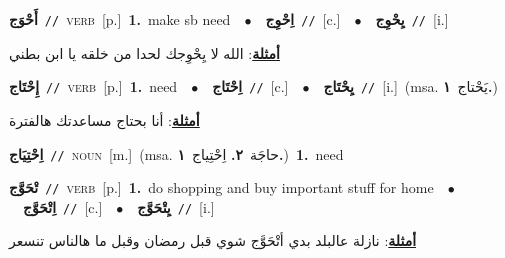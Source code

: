 \documentclass[10pt,a4paper,twoside]{article} %
\begin{document}
\begin{multicols}{2}
{\setlength\topsep{0pt}\textbf{\foreignlanguage{arabic}{أَحْوَج}}\ {\color{gray}\texttt{//}\color{black}}\ \textsc{verb}\ [p.]\ \textbf{1.}~make sb need\ \ $\bullet$\ \ \setlength\topsep{0pt}\textbf{\foreignlanguage{arabic}{اِحْوِج}}\ {\color{gray}\texttt{//}\color{black}}\ [c.]\ \ $\bullet$\ \ \setlength\topsep{0pt}\textbf{\foreignlanguage{arabic}{يِحْوِج}}\ {\color{gray}\texttt{//}\color{black}}\ [i.]\  \begin{flushright}\color{gray}\foreignlanguage{arabic}{\textbf{\underline{\foreignlanguage{arabic}{أمثلة}}}: الله لا يِحْوِجك لحدا من خلقه يا ابن بطني}\end{flushright}\color{black}} \vspace{2mm}

{\setlength\topsep{0pt}\textbf{\foreignlanguage{arabic}{إِحْتَاج}}\ {\color{gray}\texttt{//}\color{black}}\ \textsc{verb}\ [p.]\ \textbf{1.}~need\ \ $\bullet$\ \ \setlength\topsep{0pt}\textbf{\foreignlanguage{arabic}{اِحْتَاج}}\ {\color{gray}\texttt{//}\color{black}}\ [c.]\ \ $\bullet$\ \ \setlength\topsep{0pt}\textbf{\foreignlanguage{arabic}{يِحْتَاج}}\ {\color{gray}\texttt{//}\color{black}}\ [i.]\ \color{gray}(msa. \foreignlanguage{arabic}{يَحْتاج}~\foreignlanguage{arabic}{\textbf{١.}})\color{black}\  \begin{flushright}\color{gray}\foreignlanguage{arabic}{\textbf{\underline{\foreignlanguage{arabic}{أمثلة}}}: أنا بحتاج مساعدتك هالفترة}\end{flushright}\color{black}} \vspace{2mm}

{\setlength\topsep{0pt}\textbf{\foreignlanguage{arabic}{اِحْتِيَاج}}\ {\color{gray}\texttt{//}\color{black}}\ \textsc{noun}\ [m.]\ \color{gray}(msa. \foreignlanguage{arabic}{حاجَة}~\foreignlanguage{arabic}{\textbf{٢.}}  \foreignlanguage{arabic}{اِحْتِياج}~\foreignlanguage{arabic}{\textbf{١.}})\color{black}\ \textbf{1.}~need\ } \vspace{2mm}

{\setlength\topsep{0pt}\textbf{\foreignlanguage{arabic}{تْحَوَّج}}\ {\color{gray}\texttt{//}\color{black}}\ \textsc{verb}\ [p.]\ \textbf{1.}~do shopping and buy important stuff for home\ \ $\bullet$\ \ \setlength\topsep{0pt}\textbf{\foreignlanguage{arabic}{اِتْحَوَّج}}\ {\color{gray}\texttt{//}\color{black}}\ [c.]\ \ $\bullet$\ \ \setlength\topsep{0pt}\textbf{\foreignlanguage{arabic}{يِتْحَوَّج}}\ {\color{gray}\texttt{//}\color{black}}\ [i.]\  \begin{flushright}\color{gray}\foreignlanguage{arabic}{\textbf{\underline{\foreignlanguage{arabic}{أمثلة}}}: نازلة عالبلد بدي أتْحَوَّج شوي قبل رمضان وقبل ما هالناس تنسعر}\end{flushright}\color{black}} \vspace{2mm}


\end{multicols}
\end{document}
